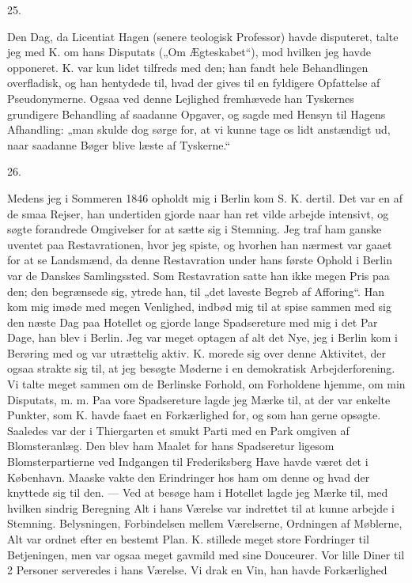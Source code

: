 \documentclass[12pt,a4paper,openany]{book}
\newcommand{\secnum}[1]{\par\begin{center}#1\end{center}\par\nobreak}
\newcommand{\opage}[1]{\marginnote{\footnotesize\textit{[#1]}}}
\begin{document}
\secnum{25.}

Den Dag, da Licentiat Hagen (senere teologisk Professor) havde
disputeret, talte jeg med K. om hans Disputats („Om
Ægteskabet“), mod hvilken jeg havde opponeret. K. var kun lidet
tilfreds med den; han fandt hele Behandlingen overfladisk, og han
hentydede til, hvad der gives til en fyldigere Opfattelse af
Pseudonymerne. Ogsaa ved denne Lejlighed fremhævede han Tyskernes
grundigere Behandling af saadanne Opgaver, og sagde med Hensyn til
Hagens Afhandling: „man skulde dog sørge for, at vi kunne tage os
lidt anstændigt ud, naar saadanne Bøger blive læste af
Tyskerne.“

\secnum{26.}

Medens jeg i Sommeren 1846 opholdt mig i Berlin kom S. K. dertil.
Det var en af de smaa Rejser, han undertiden gjorde naar han ret
vilde arbejde intensivt, og søgte forandrede Omgivelser for at
sætte sig i Stemning. Jeg traf ham ganske uventet paa
Restavrationen, hvor jeg spiste, og hvorhen han nærmest var gaaet
for at se Landsmænd, da denne Restavration under hans første
Ophold i Berlin var de Danskes Samlingssted. Som Restavration
satte han ikke megen Pris paa den; den begrænsede sig, ytrede han,
til „det laveste Begreb af Afforing“. Han kom mig imøde med megen
Venlighed, indbød mig til at spise sammen med sig den næste Dag
paa Hotellet og gjorde lange Spadsereture med mig i det Par Dage,
han blev i Berlin. Jeg var meget optagen af alt det Nye, jeg i
Berlin kom i Berøring med og var utrættelig aktiv. K. morede sig
over denne Aktivitet, der ogsaa strakte sig til, at jeg besøgte
Møderne i en demokratisk Arbejderforening. Vi talte meget sammen
\opage{356}om de Berlinske Forhold, om Forholdene hjemme, om min
Disputats, m. m. Paa vore Spadsereture lagde jeg Mærke til, at der
var enkelte Punkter, som K. havde faaet en Forkærlighed for, og
som han gerne opsøgte. Saaledes var der i Thiergarten et smukt
Parti med en Park omgiven af Blomsteranlæg. Den blev ham Maalet
for hans Spadseretur ligesom Blomsterpartierne ved Indgangen til
Frederiksberg Have havde været det i København. Maaske vakte den
Erindringer hos ham om denne og hvad der knyttede sig til den. ---
Ved at besøge ham i Hotellet lagde jeg Mærke til, med hvilken
sindrig Beregning Alt i hans Værelse var indrettet til at kunne
arbejde i Stemning. Belysningen, Forbindelsen mellem Værelserne,
Ordningen af Møblerne, Alt var ordnet efter en bestemt Plan. K.
stillede meget store Fordringer til Betjeningen, men var ogsaa
meget gavmild med sine Douceurer. Vor lille Diner til 2 Personer
serveredes i hans Værelse. Vi drak en Vin, han havde Forkærlighed
\end{document}
